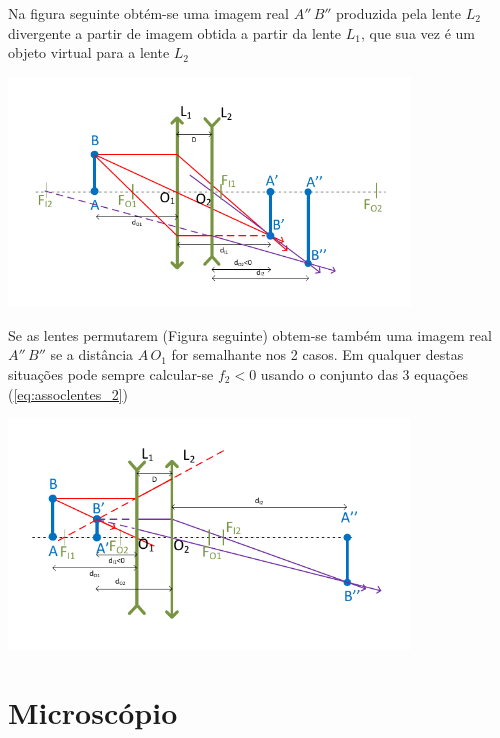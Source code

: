 \documentclass[a4paper,12pt]{article}      %
\begin{document}
Na figura seguinte obtém-se uma imagem real $A''\,B''$ produzida pela lente $L_2$ divergente a partir de imagem  obtida a partir da lente $L_1$, que sua vez é um objeto virtual para a lente $L_2$

\begin{center}
	\includegraphics[width=0.8\textwidth]{ConverDiverg_II}
\end{center}



Se as lentes permutarem (Figura seguinte) obtem-se também uma imagem real  $A''\,B''$ se a distância $A\,O_1$ for semalhante nos 2 casos.
Em qualquer destas situações pode sempre calcular-se $f_2 < 0$ usando o conjunto das 3 equações (\ref{eq:assoclentes_2})

\begin{center}
	\includegraphics[width=0.8\textwidth]{ConverDiverg_III}
\end{center}

\clearpage
\section{Microscópio}
\end{document}
